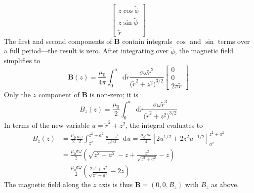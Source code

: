 \documentclass[11pt, a4paper]{article}
\newcommand{\diff}{\mathop{}\!\mathrm{d}} %
\renewcommand{\vec}[1]{\bm{#1}} %
\renewcommand{\t}[1]{\tilde{#1}} %
\newcommand{\B}{\vec{B}} %
\begin{document}
\begin{itemize}
\begin{equation*}
		\begin{bmatrix}
			z \cos \t{\phi}\\
			z \sin \t{\phi}\\
			\t{r}
		\end{bmatrix}
	\end{equation*}
	The first and second components of $ \B $ contain integrals $ \cos $ and $ \sin $ terms over a full period---the result is zero. After integrating over $ \t{\phi} $, the magnetic field simplifies to
	\begin{equation*}
		\B(z) = \frac{\mu_{0}}{4 \pi} \int_{0}^{a} \diff \t{r} \frac{\sigma \omega \t{r}^{2}}{\big(\tilde{r}^{2} + z^{2}\big)^{3/2}} 
		\begin{bmatrix}
			0\\
			0\\
			2\pi \t{r}
		\end{bmatrix}
	\end{equation*}
	Only the $ z $ component of $ \B $ is non-zero; it is
	\begin{equation*}
		B_{z}(z) = \frac{\mu_{0}}{2} \int_{0}^{a} \diff \t{r} \frac{\sigma \omega \t{r}^{3}}{\big(\tilde{r}^{2} + z^{2}\big)^{3/2}} 
	\end{equation*}
	In terms of the new variable $ u = \tilde{r}^{2} + z^{2} $, the integral evaluates to
	\begin{align*}
		B_{z}(z) &= \frac{\mu_{0}}{2} \frac{\sigma \omega}{2}\int_{z^{2}}^{z^{2} + a^{2}}\frac{u-z^{2}}{u^{3/2}} \diff u = \frac{\mu_{0}\sigma \omega}{4} \left[2u^{1/2} + 2z^{2}u^{-1/2}\right]_{a^{2}}^{z^{2}+a^{2}}\\
		 & = \frac{\mu_{0}\sigma \omega}{2} \left(\sqrt{z^{2} + a^{2}} - z + \frac{z^{2}}{\sqrt{z^{2} + a^{2}}} - z\right)\\
		 & = \frac{\mu_{0}\sigma \omega }{2}\left(\frac{2z^{2} + a^{2}}{\sqrt{z^{2} + a^{2}}} - 2z\right)
	\end{align*}
	The magnetic field along the $ z $ axis is thus $ \B = (0, 0, B_{z}) $ with $ B_{z} $ as above.
	

\end{itemize}
\end{document}
